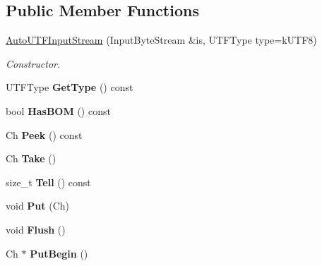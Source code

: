 \subsection*{Public Member Functions}
\begin{DoxyCompactItemize}
\item 
\hyperlink{classAutoUTFInputStream_a83837fced0971ba26dd9a8ec1575abb0}{Auto\+U\+T\+F\+Input\+Stream} (Input\+Byte\+Stream \&is, U\+T\+F\+Type type=k\+U\+T\+F8)
\begin{DoxyCompactList}\small\item\em Constructor. \end{DoxyCompactList}\item 
\mbox{\label{classAutoUTFInputStream_ad8e8b71e852db11a841fbba40431c5d1}} 
U\+T\+F\+Type {\bfseries Get\+Type} () const
\item 
\mbox{\label{classAutoUTFInputStream_a8831def623c28a3ec1d59b75abe5b20e}} 
bool {\bfseries Has\+B\+OM} () const
\item 
\mbox{\label{classAutoUTFInputStream_a616fbe24878a2026fbc7743acb50438c}} 
Ch {\bfseries Peek} () const
\item 
\mbox{\label{classAutoUTFInputStream_a652cd1ae8bd848a5ecce4efa1ebd0f38}} 
Ch {\bfseries Take} ()
\item 
\mbox{\label{classAutoUTFInputStream_a6b847c75309e4ed36957f232b9ce88d1}} 
size\+\_\+t {\bfseries Tell} () const
\item 
\mbox{\label{classAutoUTFInputStream_a5ea730d1ab715f58ce4f9e3dcd77810a}} 
void {\bfseries Put} (Ch)
\item 
\mbox{\label{classAutoUTFInputStream_aecc08f52794d761fc1b729907a83dcf8}} 
void {\bfseries Flush} ()
\item 
\mbox{\label{classAutoUTFInputStream_a761841842c147c0bb1a69bfacbc117a2}} 
Ch $\ast$ {\bfseries Put\+Begin} ()
\item 
\mbox{\label{classAutoUTFInputStream_a41bd66602f82d344383792feac34f9f7}} 

\end{DoxyCompactItemize}
